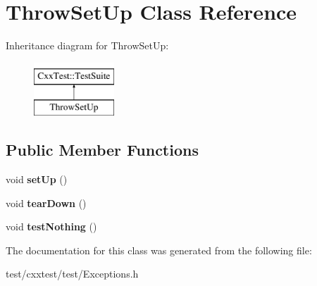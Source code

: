 \hypertarget{classThrowSetUp}{\section{Throw\-Set\-Up Class Reference}
\label{classThrowSetUp}
}
Inheritance diagram for Throw\-Set\-Up\-:\begin{figure}[H]
\begin{center}
\leavevmode
\includegraphics[height=2.000000cm]{classThrowSetUp}
\end{center}
\end{figure}
\subsection*{Public Member Functions}
\begin{DoxyCompactItemize}
\item 
\hypertarget{classThrowSetUp_a876b434d59fb019b63d899a73be95aa1}{void {\bfseries set\-Up} ()}\label{classThrowSetUp_a876b434d59fb019b63d899a73be95aa1}

\item 
\hypertarget{classThrowSetUp_a7df1ca6e7f68357789e16fa2376598c6}{void {\bfseries tear\-Down} ()}\label{classThrowSetUp_a7df1ca6e7f68357789e16fa2376598c6}

\item 
\hypertarget{classThrowSetUp_a70061e3d045f62362fdcf188dfde4d18}{void {\bfseries test\-Nothing} ()}\label{classThrowSetUp_a70061e3d045f62362fdcf188dfde4d18}

\end{DoxyCompactItemize}


The documentation for this class was generated from the following file\-:\begin{DoxyCompactItemize}
\item 
test/cxxtest/test/Exceptions.\-h\end{DoxyCompactItemize}
